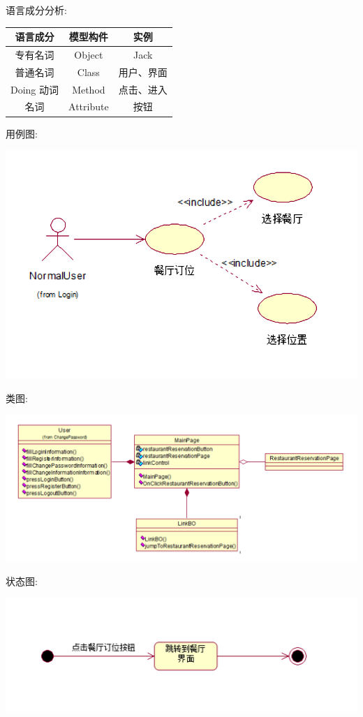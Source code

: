 \documentclass[11pt]{article}
\begin{document}
			语言成分分析:
			\begin{center}
			\begin{tabular}{|c|c|c|}
			\hline
			语言成分 & 模型构件 & 实例\\ \hline
			专有名词 & Object & Jack  \\ \hline
			普通名词 & Class & 用户、界面 \\ \hline
			Doing 动词 & Method &  点击、进入 \\ \hline
			名词 & Attribute & 按钮 \\ \hline
			\end{tabular}
			\end{center}
			
			用例图: 
			\begin{center}
			\includegraphics[scale=0.42]{餐厅订位_用例图.png}
			\end{center}

			类图: 
			\begin{center}
			\includegraphics[scale=0.42]{餐厅订位_类图.png}
			\end{center}

			状态图: 
			\begin{center}
			\includegraphics[scale=0.42]{餐厅订位_状态图.png}
			\end{center}
\end{document}
